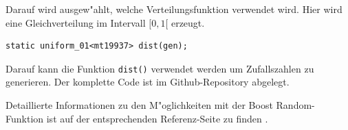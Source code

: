 \begin{refsection}
Darauf wird ausgew"ahlt, welche Verteilungsfunktion verwendet wird. Hier
wird eine Gleichverteilung im Intervall $[0,1[$ erzeugt.

\begin{lstlisting}[style=C]
static uniform_01<mt19937> dist(gen); 
\end{lstlisting}

Darauf kann die Funktion \texttt{dist()} verwendet werden um
Zufallszahlen zu generieren. Der komplette Code ist im Github-Repository
\cite{rng:githubRepo} abgelegt.

Detaillierte Informationen zu den M"oglichkeiten mit der Boost
Random-Funktion ist auf der entsprechenden Referenz-Seite zu finden
\cite{rng:boostRandom}.



\newpage
\printbibliography[heading=subbibliography]
\end{refsection}
